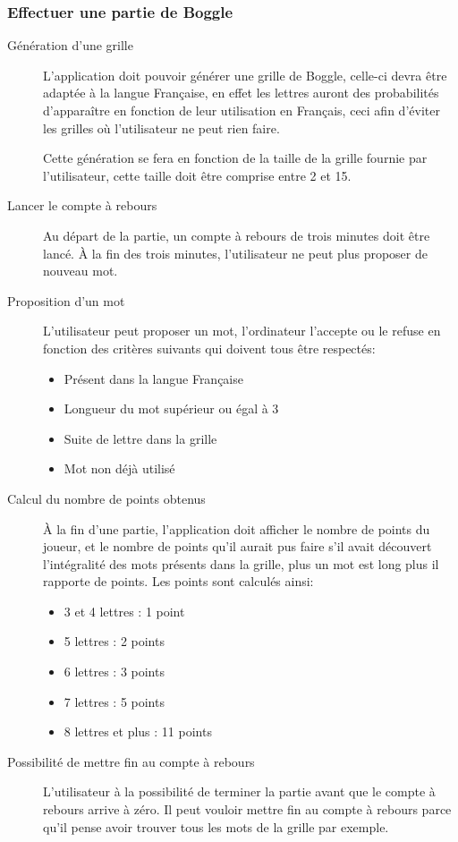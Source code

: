 \documentclass[12pt,a4paper,openany]{article}
\begin{document}
	\subsubsection{Effectuer une partie de Boggle}
		\begin{description}
				\item[Génération d'une grille] L'application doit pouvoir générer une grille de Boggle, celle-ci devra être adaptée à la langue Française, en
				effet les lettres auront des probabilités d'apparaître en fonction de leur utilisation en Français, ceci afin d'éviter les grilles où
				l'utilisateur ne peut rien faire.
				
				Cette génération se fera en fonction de la taille de la grille fournie par l'utilisateur, cette taille doit être comprise entre 2 et 15.
				\item[Lancer le compte à rebours] Au départ de la partie, un compte à rebours de trois minutes doit être lancé. À la fin des trois
					minutes, l'utilisateur ne peut plus proposer de nouveau mot.
				\item[Proposition d'un mot] L'utilisateur peut proposer un mot, l'ordinateur l'accepte ou le refuse en fonction des critères suivants
					qui doivent tous être respectés:
					\begin{itemize}
						\item Présent dans la langue Française
						\item Longueur du mot supérieur ou égal à 3
						\item Suite de lettre dans la grille
						\item Mot non déjà utilisé
					\end{itemize}
				\item[Calcul du nombre de points obtenus] À la fin d'une partie, l'application doit afficher le nombre de points du joueur, et le
					nombre de points qu'il aurait pus faire s'il avait découvert l'intégralité des mots présents dans la grille, plus un mot est long
					plus il rapporte de points. Les points sont calculés ainsi:
					\begin{itemize}
						\item 3 et 4 lettres : 1 point
						\item 5 lettres : 2 points
						\item 6 lettres : 3 points
						\item 7 lettres : 5 points
						\item 8 lettres et plus : 11 points
					\end{itemize}
				\item[Possibilité de mettre fin au compte à rebours] L'utilisateur à la possibilité de terminer la partie avant que le
					compte à rebours arrive à zéro. Il peut vouloir mettre fin au compte à rebours parce qu'il pense avoir trouver
					tous les mots de la grille par exemple.
		\end{description}
\end{document}
